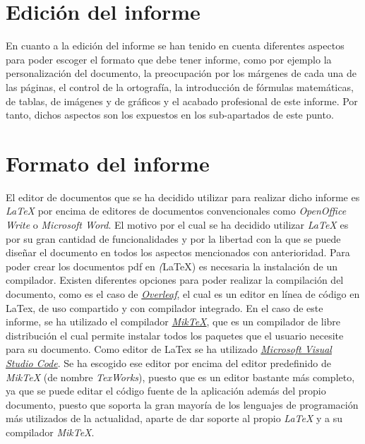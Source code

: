 
\section{Edición del informe}
    En cuanto a la edición del informe se han tenido en cuenta diferentes aspectos para poder escoger el formato que debe tener informe, como por ejemplo la personalización del documento, la preocupación por 
    los márgenes de cada una de las páginas, el control de la ortografía, la introducción de fórmulas matemáticas, de tablas, de imágenes y de gráficos y el acabado profesional de este informe. Por tanto, dichos
    aspectos son los expuestos en los sub-apartados de este punto.
    \section{Formato del informe}
    El editor de documentos que se ha decidido utilizar para realizar dicho informe es \textit{LaTeX} por encima de editores de documentos convencionales como \textit{OpenOffice Write} o \textit{Microsoft Word}.
    El motivo por el cual se ha decidido utilizar \textit{LaTeX} es por su gran cantidad de funcionalidades y por la libertad con la que se puede diseñar el documento en todos los aspectos mencionados con anterioridad.
    Para poder crear los documentos pdf en \textit(LaTeX) es necesaria la instalación de un compilador. Existen diferentes opciones para poder realizar la compilación del documento, como es el caso de 
    \color{blue}\href{{https://es.overleaf.com/}}{\textit{Overleaf}}\color{black}, el cual es un editor en línea de código en LaTex, de uso compartido y con compilador integrado.
    En el caso de este informe, se ha utilizado el compilador \color{blue}\href{{https://miktex.org/}}{\textit{MikTeX}}\color{black}, que es un compilador de libre distribución el cual permite instalar todos los paquetes 
    que el usuario necesite para su documento. Como editor de LaTex se ha utilizado \color{blue}\href{https://code.visualstudio.com/}{\textit{Microsoft Visual Studio Code}}\color{black}. Se ha escogido ese editor por encima 
    del editor predefinido de \textit{MikTeX} (de nombre \textit{TexWorks}), puesto que es un editor bastante más completo, ya que se puede editar el código fuente de la aplicación además del propio documento, puesto que soporta la 
    gran mayoría de los lenguajes de programación más utilizados de la actualidad, aparte de dar soporte al propio \textit{LaTeX} y a su compilador \textit{MikTeX}.

